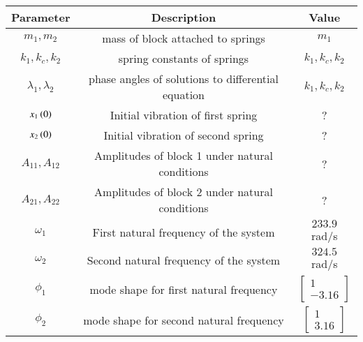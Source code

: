 \begin{tabular}{|c|c|c|}
    \hline
    \textbf{Parameter} & \textbf{Description} & \textbf{Value} \\
    \hline
    $m_1,m_2$ & mass of block attached to springs& $ m_1$\\
    \hline
    $k_1,k_c,k_2$ & spring constants of springs& $ k_1,k_c,k_2$\\
    \hline
    $\lambda_1,\lambda_2$ & phase angles of solutions to differential equation& $ k_1,k_c,k_2$\\
    \hline
    $x_1\left(0\right)$ & Initial vibration of first spring& ? \\
    \hline
    $x_2\left(0\right)$ & Initial vibration of second spring & ? \\
    \hline
    $A_{11},A_{12}$ & Amplitudes of block 1 under natural conditions& ?\\
    \hline
    $A_{21},A_{22}$ & Amplitudes of block 2 under natural conditions& ?\\
    \hline
    $\omega_1$ & First natural frequency of the system& $ 233.9$ rad/s\\
    \hline
    $\omega_2$ & Second natural frequency of the system &$ 324.5$ rad/s \\
    \hline
    $\phi_1$ & mode shape for first natural frequency& $ \begin{bmatrix}
1\\
-3.16
\end{bmatrix}$\\
    \hline
    $\phi_2$ & mode shape for second natural frequency& $ \begin{bmatrix}
1\\
3.16
\end{bmatrix}$\\
    \hline
\end{tabular}





